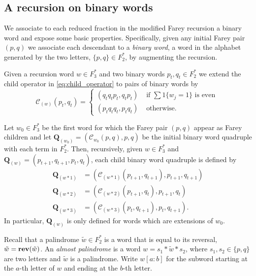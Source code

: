 \documentclass[12pt]{amsart}
\begin{document}
\subsection{A recursion on binary words}

We associate to each reduced fraction in the modified Farey recursion a binary word
and expose some basic properties. Specifically, given any initial Farey pair
$(p,q)$ we associate each descendant to a {\it binary word}, a word in the alphabet generated by the two letters, $\{p,q\} \in F_2^*$,
by augmenting the recursion. 

Given a recursion word $w \in F_3^*$ and two binary words $p_t, q_t \in F_2^*$ we extend the child operator in \eqref{eq:child_operator}
to pairs of binary words by 
\begin{equation}
\mathcal{C}_{(w)}(p_t, q_t) = 
\begin{cases}
(q_t q_t p_t, q_t p_t) &\mbox{ if $\sum 1\{w_j = 1\}$ is even } \\
(p_t q_t q_t, p_t q_t) &\mbox{ otherwise}.
\end{cases}
\end{equation}

Let $w_0 \in F_3^*$ be the first word for which the Farey pair $(p,q)$ appear as Farey children and let $\mathbf{Q}_{(w_0)} = ( \mathcal{C}_{w_0}(p,q), p, q)$
be the initial binary word quadruple with each term in $F_2^*$. Then, recursively, given $w \in F_3^*$ and $\mathbf{Q}_{(w)} = (p_{t+1}, q_{t+1}, p_t, q_t)$,
each child binary word quadruple is defined by 
\begin{equation} \label{eq:child_farey_quad_continuedfrac}
\begin{aligned}
\mathbf{Q}_{(w*1)}  &= \left(\mathcal{C}_{(w*1)}(p_{t+1},q_{t+1}),  p_{t+1}, q_{t+1} \right)  \\
\mathbf{Q}_{(w*2)}  &= \left(\mathcal{C}_{(w*2)}(p_{t+1},q_t), p_{t+1}, q_t \right)  \\
\mathbf{Q}_{(w*3)}  &= \left(\mathcal{C}_{(w*3)}(p_t,q_{t+1}), p_t, q_{t+1} \right).
\end{aligned}	
\end{equation}
In particular, $\mathbf{Q}_{(w)}$ is only defined for words which are extensions of $w_0$. 


Recall that a palindrome $\tilde{w} \in F_2^*$ is a word that is equal to its reversal, $\tilde{w} = \mathop{\bf rev}(\tilde{w})$. 
An {\it almost palindrome} is a word $w = s_1 * \tilde{w} * s_2$, where $s_1,s_2 \in \{p,q\}$ are two letters
and $\tilde{w}$ is a palindrome.  Write $w[a:b]$ for the subword starting at the $a$-th letter of $w$ 
and ending at the $b$-th letter. 
\end{document}

